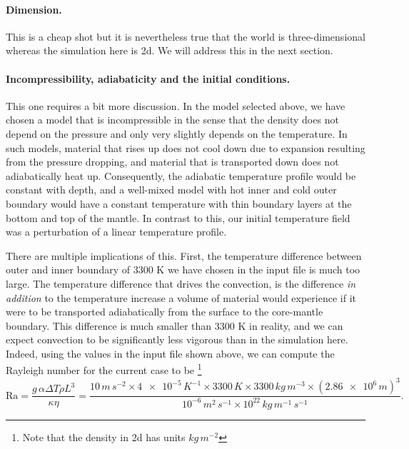 \documentclass{article}
\begin{document}
\paragraph{Dimension.} This is a cheap shot but it is nevertheless true that the
world is three-dimensional whereas the simulation here is 2d. We will address
this in the next section.

\paragraph{Incompressibility, adiabaticity and the initial conditions.} This one
requires a bit more discussion. In the model selected above, we have chosen a
model that is incompressible in the sense that the density does not depend on
the pressure and only very slightly depends on the temperature. 
In such models, material that rises up does not cool down due to
expansion resulting from the pressure dropping, and material that is transported
down does not adiabatically heat up. Consequently, the adiabatic temperature
profile would be constant with depth, and a well-mixed model with hot inner and
cold outer boundary would have a constant temperature with thin boundary layers
at the bottom and top of the mantle. In contrast to this, our initial
temperature field was a perturbation of a linear temperature profile.

There are multiple implications of this. First, the temperature difference
between outer and inner boundary of 3300 K we have chosen in the input file is
much too large. The temperature difference that drives the convection, 
is the difference \textit{in addition} to the temperature increase a volume of 
material would experience if it were to be
transported adiabatically from the surface to the core-mantle boundary. This
difference is much smaller than 3300 K in reality, and we can expect convection
to be significantly less vigorous than in the simulation here. Indeed, using
the values in the input file shown above, we can compute the Rayleigh number for
the current case to be%
\footnote{Note that the density in 2d has units $\si{kg}\,\si{m}^{-2}$}
\begin{equation*}
  \textrm{Ra}
  =
  \frac{g\, \alpha  \Delta T  \rho  L^3}{\kappa\eta}
=
  \frac{10\, \si{m}\,\si{s}^{-2} \times \num{4e-5}\, \si{K}^{-1} \times 3300\,
  \si{K} \times 3300\, \si{kg}\,\si{m}^{-3} \times (\num{2.86e6}
  \, \si{m})^3}{10^{-6}\, \si{m}^2\,\si{s}^{-1}\times 10^{22}\,
  \si{kg}\,\si{m}^{-1}\,\si{s}^{-1}}.
\end{equation*}
\end{document}
